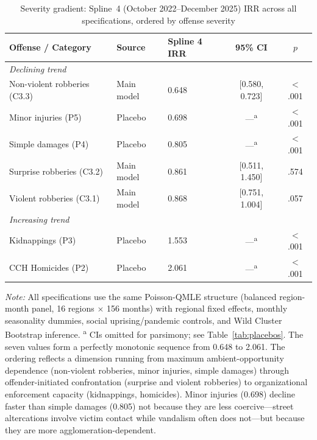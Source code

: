 \documentclass[pdflatex,sn-basic]{sn-jnl}
\newcommand{\tablenote}[1]{%
  \vspace{2pt}%
  {\par\footnotesize\textit{Note:} #1\par}%
}
\begin{document}
\begin{table}[htbp]
\centering
\caption{Severity gradient: Spline~4 (October 2022--December 2025) IRR across all specifications, ordered by offense severity}
\label{tab:gradiente}
\footnotesize
\begin{tabular}{lllcc}
\toprule
\textbf{Offense / Category} & \textbf{Source} & \textbf{Spline 4 IRR} & \textbf{95\% CI} & $p$ \\
\midrule
\multicolumn{5}{l}{\textit{Declining trend}} \\
Non-violent robberies (C3.3) & Main model & 0.648 & [0.580, 0.723] & $<$.001 \\
Minor injuries (P5)          & Placebo    & 0.698 & ---\textsuperscript{a}            & $<$.001 \\
Simple damages (P4)          & Placebo    & 0.805 & ---\textsuperscript{a}            & $<$.001 \\
Surprise robberies (C3.2)    & Main model & 0.861 & [0.511, 1.450] & .574 \\
Violent robberies (C3.1)     & Main model & 0.868 & [0.751, 1.004] & .057 \\
\midrule
\multicolumn{5}{l}{\textit{Increasing trend}} \\
Kidnappings (P3)             & Placebo    & 1.553 & ---\textsuperscript{a}            & $<$.001 \\
CCH Homicides (P2)           & Placebo    & 2.061 & ---\textsuperscript{a}            & $<$.001 \\
\bottomrule
\end{tabular}
\tablenote{All specifications use the same Poisson-QMLE structure (balanced region-month panel, 16 regions $\times$ 156 months) with regional fixed effects, monthly seasonality dummies, social uprising/pandemic controls, and Wild Cluster Bootstrap inference. \textsuperscript{a} CIs omitted for parsimony; see Table~\ref{tab:placebos}. The seven values form a perfectly monotonic sequence from 0.648 to 2.061. The ordering reflects a dimension running from maximum ambient-opportunity dependence (non-violent robberies, minor injuries, simple damages) through offender-initiated confrontation (surprise and violent robberies) to organizational enforcement capacity (kidnappings, homicides). Minor injuries (0.698) decline faster than simple damages (0.805) not because they are less coercive---street altercations involve victim contact while vandalism often does not---but because they are more agglomeration-dependent.}
\end{table}
\end{document}
